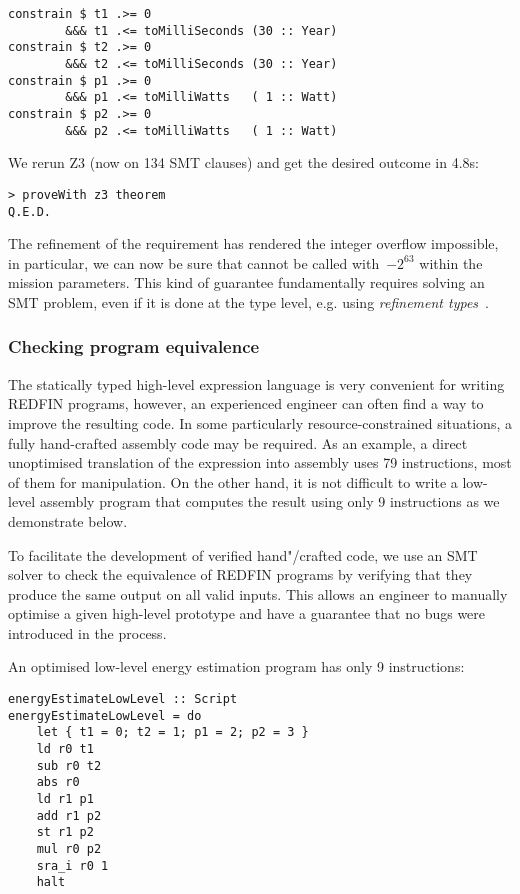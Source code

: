 \begin{verbatim}
constrain $ t1 .>= 0
        &&& t1 .<= toMilliSeconds (30 :: Year)
constrain $ t2 .>= 0
        &&& t2 .<= toMilliSeconds (30 :: Year)
constrain $ p1 .>= 0
        &&& p1 .<= toMilliWatts   ( 1 :: Watt)
constrain $ p2 .>= 0
        &&& p2 .<= toMilliWatts   ( 1 :: Watt)
\end{verbatim}


\noindent
We rerun Z3 (now on 134 SMT clauses) and get the desired outcome in 4.8s:


\begin{verbatim}
> proveWith z3 theorem
Q.E.D.
\end{verbatim}


\noindent
The refinement of the requirement has rendered the integer overflow impossible,
in particular, we can now be sure that  cannot be called with~$-2^{63}$
within the mission parameters. This kind of guarantee fundamentally requires
solving an SMT problem, even if it is done at the type level, e.g. using
\emph{refinement types}~\cite{vazou2014refinement}.


\subsubsection{Checking program equivalence}
The statically typed high-level expression language is very convenient for
writing REDFIN programs, however, an experienced engineer can often find a way
to improve the resulting code. In some particularly resource-constrained situations,
a fully hand-crafted assembly code may be required. As an example, a direct
unoptimised translation of the  expression into assembly uses
79 instructions, most of them for  manipulation.
On the other hand, it is not difficult to write a low-level assembly program that
computes the result using only 9 instructions as we demonstrate below.

To facilitate the development of verified hand"/crafted code, we use an SMT
solver to check the equivalence of REDFIN programs by verifying that they produce
the same output on all valid inputs. This allows an engineer to manually
optimise a given high-level prototype and have a guarantee that no bugs were
introduced in the process.

An optimised low-level energy estimation program has only 9 instructions:


\begin{verbatim}
energyEstimateLowLevel :: Script
energyEstimateLowLevel = do
    let { t1 = 0; t2 = 1; p1 = 2; p2 = 3 }
    ld r0 t1
    sub r0 t2
    abs r0
    ld r1 p1
    add r1 p2
    st r1 p2
    mul r0 p2
    sra_i r0 1
    halt
\end{verbatim}
\label{energyEstimateLowLevel}


